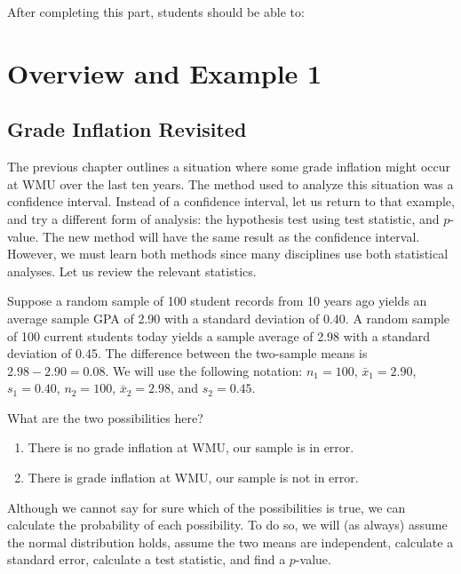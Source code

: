 \documentclass[11pt, chapterprefix=true]{scrbook}\usepackage[]{graphicx}\usepackage[]{color}
\begin{document}
After completing this part, students should be able to:


\section{Overview and Example 1}

\subsection{Grade Inflation Revisited}

The previous chapter outlines a situation where some grade inflation might occur at WMU over the last ten years.  The method used to analyze this situation was a confidence interval.  Instead of a confidence interval, let us return to that example, and try a different form of analysis:  the hypothesis test using test statistic, and $p$-value.  The new method will have the same result as the confidence interval.  However, we must learn both methods since many disciplines use both statistical analyses.  Let us review the relevant statistics.

Suppose a random sample of 100 student records from 10 years ago yields an average sample GPA of 2.90 with a standard deviation of 0.40. A random sample of 100 current students today yields a sample average of 2.98 with a standard deviation of 0.45. The difference between the two-sample means is $2.98 - 2.90 = 0.08$.  We will use the following  notation: $n_1 = 100$, $\bar{x}_1 = 2.90$, $s_1 = 0.40$, $n_2 = 100$, $\bar{x}_2 = 2.98$, and $s_2 = 0.45$.


What are the two possibilities here?


\begin{enumerate}
\item There is no grade inflation at WMU, our sample is in error.
\item There is grade inflation at WMU, our sample is not in error.
\end{enumerate}


Although we cannot say for sure which of the possibilities is true, we can calculate the probability of each possibility. To do so, we will (as always) assume the normal distribution holds, assume the two means are independent, calculate a standard error, calculate a test statistic, and find a $p$-value.
\end{document}
